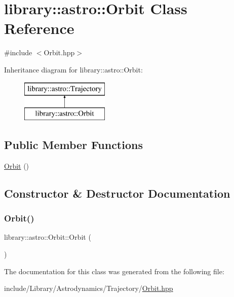 \hypertarget{classlibrary_1_1astro_1_1_orbit}{}\section{library\+:\+:astro\+:\+:Orbit Class Reference}
\label{classlibrary_1_1astro_1_1_orbit}


{\ttfamily \#include $<$Orbit.\+hpp$>$}

Inheritance diagram for library\+:\+:astro\+:\+:Orbit\+:\begin{figure}[H]
\begin{center}
\leavevmode
\includegraphics[height=2.000000cm]{classlibrary_1_1astro_1_1_orbit}
\end{center}
\end{figure}
\subsection*{Public Member Functions}
\begin{DoxyCompactItemize}
\item 
\hyperlink{classlibrary_1_1astro_1_1_orbit_a43961ea3c87aab4a726406f36ed193f2}{Orbit} ()
\end{DoxyCompactItemize}


\subsection{Constructor \& Destructor Documentation}
\mbox{\label{classlibrary_1_1astro_1_1_orbit_a43961ea3c87aab4a726406f36ed193f2}} 
\subsubsection{\texorpdfstring{Orbit()}{Orbit()}}
{\footnotesize\ttfamily library\+::astro\+::\+Orbit\+::\+Orbit (\begin{DoxyParamCaption}{ }\end{DoxyParamCaption})}



The documentation for this class was generated from the following file\+:\begin{DoxyCompactItemize}
\item 
include/\+Library/\+Astrodynamics/\+Trajectory/\hyperlink{_orbit_8hpp}{Orbit.\+hpp}\end{DoxyCompactItemize}

